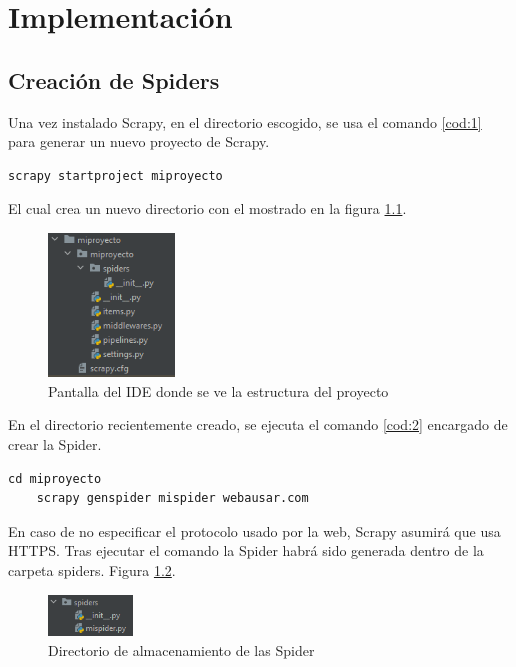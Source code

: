 \chapter[Implementación]{Implementación}
\label{Chap5}

\section{Creación de Spiders}
Una vez instalado Scrapy, en el directorio escogido, se usa el comando \ref{cod:1} para generar un nuevo proyecto de Scrapy.

\begin{lstlisting}[caption={Instrucciones de consola en Linux para la creación de un proyecto scrapy}, label=cod:1]
	scrapy startproject miproyecto
\end{lstlisting}

El cual crea un nuevo directorio con el mostrado en la figura \ref{fig:ej11}.

\begin{figure} [h!]
	\centering
	\includegraphics[width=0.3\textwidth]{fig/estructura_proyecto_scrapy.png}
	\caption[Pantalla del IDE donde se ve la estructura del proyecto]{Pantalla del IDE donde se ve la estructura del proyecto}
	\label{fig:ej11}
\end{figure}

En el directorio recientemente creado, se ejecuta el comando \ref{cod:2} encargado de crear la Spider.

\begin{lstlisting}[caption={Instrucciones de consola en Linux para la creación de una Spider scrapy}, label=cod:2]
	cd miproyecto
	scrapy genspider mispider webausar.com
\end{lstlisting}

En caso de no especificar el protocolo usado por la web, Scrapy asumirá que usa HTTPS. Tras ejecutar el comando la Spider habrá sido generada dentro de la carpeta spiders. Figura \ref{fig:ej12}.

\begin{figure} [h!]
	\centering
	\includegraphics[width=0.2\textwidth]{fig/primera_spider.png}
	\caption[Directorio de almacenamiento de las Spider]{Directorio de almacenamiento de las Spider}
	\label{fig:ej12}
\end{figure}


